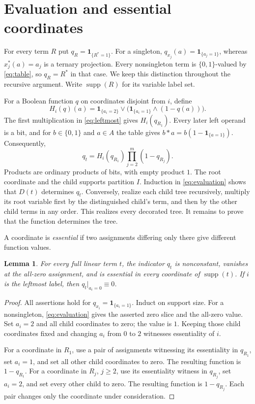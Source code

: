 \documentclass[11pt]{article}
\newtheorem{lemma}[theorem]{Lemma}
\newcommand{\ind}{\mathbf{1}}
\DeclareMathOperator{\supp}{supp}
\begin{document}
\section{Evaluation and essential coordinates}

For every term $R$ put $q_R=\ind_{\{R^*=1\}}$. For a singleton,
$q_{x_j}(a)=\ind_{\{a_j=1\}}$, whereas $x_j^*(a)=a_j$ is a ternary
projection. Every nonsingleton term is $\{0,1\}$-valued by
\eqref{eq:table}, so $q_R=R^*$ in that case. We keep this distinction
throughout the recursive argument. Write $\supp(R)$ for its variable
label set.

For a Boolean function $q$ on coordinates disjoint from $i$, define
\[
H_i(q)(a)=\ind_{\{a_i=2\}}\vee
          \bigl(\ind_{\{a_i=1\}}\wedge(1-q(a))\bigr).
\]
The first multiplication in \eqref{eq:leftmost} gives $H_i(q_{R_1})$.
Every later left operand is a bit, and for $b\in\{0,1\}$ and $a\in A$
the table gives $b\ast a=b(1-\ind_{\{a=1\}})$. Consequently,
\begin{equation}\label{eq:evaluation}
q_t=H_i(q_{R_1})\prod_{j=2}^{m}(1-q_{R_j}).
\end{equation}
Products are ordinary products of bits, with empty product $1$.
The root coordinate and the child supports partition $I$.
Induction in \eqref{eq:evaluation} shows that $D(t)$ determines $q_t$.
Conversely, realize each child tree recursively, multiply its root
variable first by the distinguished child's term, and then by the other
child terms in any order. This realizes every decorated tree. It remains
to prove that the function determines the tree.

A coordinate is \emph{essential} if two assignments differing only there
give different function values.
\begin{lemma}\label{lem:essential}
For every full linear term $t$, the indicator $q_t$ is nonconstant,
vanishes at the all-zero assignment, and is essential in every coordinate
of $\supp(t)$. If $i$ is the leftmost label, then
$q_t|_{a_i=0}\equiv0$.
\end{lemma}
\begin{proof}
All assertions hold for $q_{x_i}=\ind_{\{a_i=1\}}$. Induct on support
size. For a nonsingleton, \eqref{eq:evaluation} gives the asserted zero
slice and the all-zero value. Set $a_i=2$ and all child coordinates to
zero; the value is $1$. Keeping those child coordinates fixed and changing
$a_i$ from $0$ to $2$ witnesses essentiality of $i$.

For a coordinate in $R_1$, use a pair of assignments witnessing its
essentiality in $q_{R_1}$, set $a_i=1$, and set all other child coordinates
to zero. The resulting function is $1-q_{R_1}$. For a coordinate in $R_j$,
$j\geq2$, use its essentiality witness in $q_{R_j}$, set $a_i=2$, and set
every other child to zero. The resulting function is $1-q_{R_j}$.
Each pair changes only the coordinate under consideration.
\end{proof}
\end{document}
